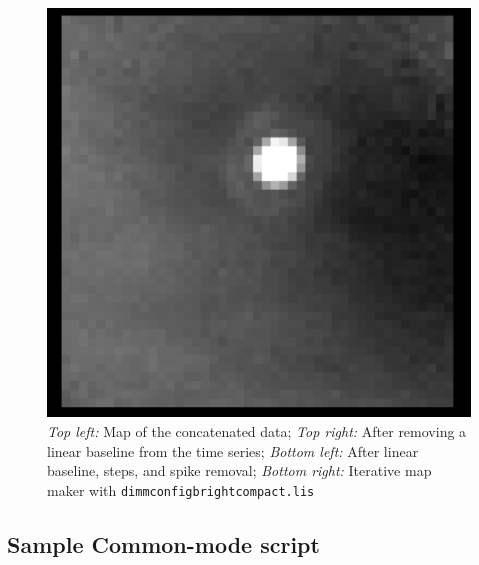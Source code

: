\documentclass[twoside,11pt]{article}
\newcommand{\xlabel}[1]{}
\renewcommand{\_}{\texttt{\symbol{95}}}
\begin{document}
\begin{figure}[ht]
\begin{center}
\includegraphics[width=0.45\linewidth]
           {sc19_dimmconfig_bright_compact_smallmap}
\caption{
\textsl{Top left:} Map of the concatenated data;
\textsl{Top right:} After removing a linear baseline from the time series;
\textsl{Bottom left:} After linear baseline, steps, and spike removal;
\textsl{Bottom right:} Iterative map maker with \texttt{dimmconfig\_bright\_compact.lis}
}
\label{fig:samplemaps}
\end{center}
\end{figure}


\newpage
\subsection{\xlabel{script}Sample Common-mode script}
\label{sec:script}
\end{document}
